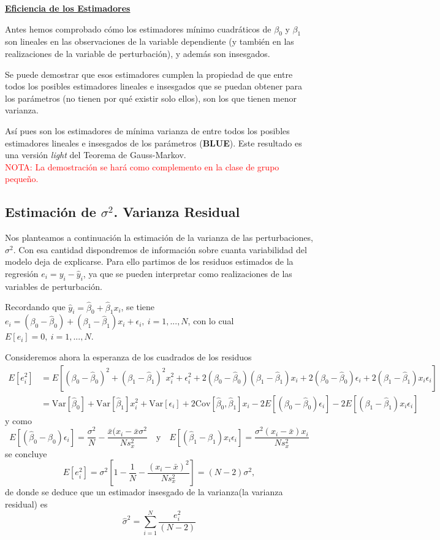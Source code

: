 \documentclass[10pt,a4paper]{book}
\begin{document}
\underline{\textbf{Eficiencia de los Estimadores}}

Antes hemos comprobado cómo los estimadores mínimo cuadráticos de $\beta_0$ y $\beta_1$ son lineales en las observaciones de la variable dependiente (y también en las realizaciones de la variable de perturbación), y además son insesgados.

Se puede demostrar que esos estimadores cumplen la propiedad de que entre todos los posibles estimadores lineales e insesgados que se puedan obtener para los parámetros (no tienen por qué existir solo ellos), son los que tienen menor varianza.

Así pues son los estimadores de mínima varianza de entre todos los posibles estimadores lineales e
insesgados de los parámetros (\textbf{BLUE}). Este resultado es una versión \textit{light} del Teorema de Gauss-Markov.
\ \\

\textcolor{red}{NOTA: La demostración se hará como complemento en la clase de grupo pequeño.}
		\subsection{Estimación de $\sigma^2$. Varianza Residual}
Nos planteamos a continuación la estimación de la varianza de las perturbaciones, $\sigma^2$. Con esa cantidad dispondremos de información sobre cuanta variabilidad del modelo deja de explicarse. Para ello partimos de los residuos estimados de la regresión $e_i=y_i-\widehat{y}_i$, ya que se pueden interpretar como realizaciones de las variables de perturbación.

Recordando que $\widehat{y}_i=\widehat{\beta}_0+\widehat{\beta}_1x_i$, se tiene $e_i=(\beta_0-\widehat{\beta}_0)+(\beta_1-\widehat{\beta}_1)x_i+\epsilon_i,\ i=1,...,N$, con lo cual $E[e_i]=0,\ i=1,...,N$.

Consideremos ahora la esperanza de los cuadrados de los residuos
\begin{equation*}
\begin{split}
E[e^2_i]&=E\left[(\beta_0-\widehat{\beta}_0)^2+(\beta_1-\widehat{\beta}_1)^2x^2_i+\epsilon^2_i+2(\beta_0-\widehat{\beta}_0)(\beta_1-\widehat{\beta}_1)x_i+2(\beta_0-\widehat{\beta}_0)\epsilon_i+2(\beta_1-\widehat{\beta}_1)x_i\epsilon_i\right]\\
&=\mathrm{Var}[\widehat{\beta}_0]+\mathrm{Var}[\widehat{\beta}_1]x^2_i+\mathrm{Var}[\epsilon_i]+2\mathrm{Cov}[\widehat{\beta}_0,\widehat{\beta}_1]x_i-2E[(\beta_0-\widehat{\beta}_0)\epsilon_i]-2E[(\beta_1-\widehat{\beta}_1)x_i\epsilon_i]
\end{split}
\end{equation*}
y como $$E[(\widehat{\beta}_0-\beta_0)\epsilon_i]=\dfrac{\sigma^2}{N}-\dfrac{\bar{x}(x_i-\bar{x}\sigma^2}{Ns^2_x}\quad \mathrm{y} \quad E[(\widehat{\beta}_1-\beta_1)x_i\epsilon_i]=\dfrac{\sigma^2(x_i-\bar{x})x_i}{Ns^2_x}$$ se concluye $$E[e^2_i]=\sigma^2\left[1-\dfrac{1}{N}-\dfrac{(x_i-\bar{x})^2}{Ns^2_x}\right]=(N-2)\sigma^2,$$ de donde se deduce que un estimador insesgado de la varianza(la varianza residual) es $$\widehat{\sigma}^2=\sum^N_{i=1}\frac{e^2_i}{(N-2)}$$
\ \\
\end{document}
